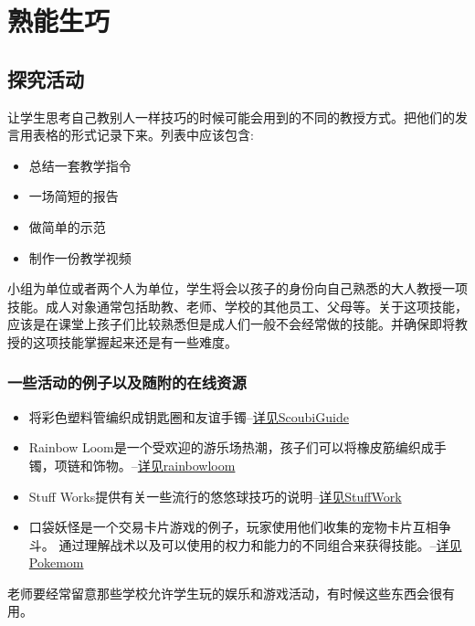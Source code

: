 \chapter{熟能生巧}

\section{探究活动}
    让学生思考自己教别人一样技巧的时候可能会用到的不同的教授方式。把他们的发言用表格的形式记录下来。列表中应该包含:\par
    \begin{itemize}
      \item 总结一套教学指令
      \item 一场简短的报告
      \item 做简单的示范 
      \item 制作一份教学视频  
    \end{itemize}  
    
    小组为单位或者两个人为单位，学生将会以孩子的身份向自己熟悉的大人教授一项技能。成人对象通常包括助教、老师、学校的其他员工、父母等。关于这项技能，应该是在课堂上孩子们比较熟悉但是成人们一般不会经常做的技能。并确保即将教授的这项技能掌握起来还是有一些难度。\par
\subsection{一些活动的例子以及随附的在线资源}    
    
   \begin{itemize}
      \item  将彩色塑料管编织成钥匙圈和友谊手镯--\href{http://www.scoubiguide.co.uk/}{详见ScoubiGuide}
      \item  Rainbow Loom是一个受欢迎的游乐场热潮，孩子们可以将橡皮筋编织成手镯，项链和饰物。--\href{http://www.rainbowloom.com/}{详见rainbowloom}
      \item  Stuff Works提供有关一些流行的悠悠球技巧的说明--\href{http://entertainment.howstuffworks.com/easy-yo-yo-tricks.htm}{详见StuffWork}
      \item  口袋妖怪是一个交易卡片游戏的例子，玩家使用他们收集的宠物卡片互相争斗。 通过理解战术以及可以使用的权力和能力的不同组合来获得技能。--\href{http://www.pokemon.com/uk/pokemon-tcg/play-online/tutorial/}{详见Pokemom}
    \end{itemize}  

   \begin{note}
     老师要经常留意那些学校允许学生玩的娱乐和游戏活动，有时候这些东西会很有用。
   \end{note}  
   

